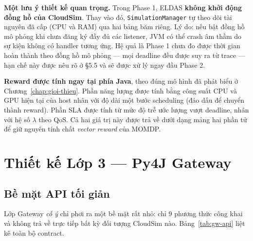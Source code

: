 \textbf{Một lưu ý thiết kế quan trọng.} Trong Phase 1, ELDAS
\textbf{không khởi động đồng hồ của CloudSim}. Thay vào đó,
\texttt{SimulationManager} tự theo dõi tài nguyên đã cấp (CPU và RAM)
qua hai bảng băm riêng. Lý do: nếu bật đồng hồ mô phỏng khi chưa đăng
ký đầy đủ các listener, JVM có thể crash âm thầm do sự kiện không có
handler tương ứng. Hệ quả là Phase 1 chưa đo được thời gian hoàn thành
theo đồng hồ mô phỏng --- mọi deadline đều được suy ra từ trace ---
hạn chế này được nêu rõ ở §5.5 và sẽ được xử lý ngay đầu Phase 2.

\textbf{Reward được tính ngay tại phía Java}, theo đúng mô hình đã
phát biểu ở Chương~\ref{chap:gioi-thieu}. Phần năng lượng được tính
bằng công suất CPU và GPU hiện tại của host nhân với độ dài một bước
scheduling (đảo dấu để chuyển thành reward). Phần SLA được tính từ
mức độ trễ ước lượng vượt deadline, nhân với hệ số $\lambda$ theo
QoS. Cả hai giá trị này được trả về dưới dạng mảng hai phần tử để giữ
nguyên tính chất \textit{vector reward} của MOMDP.

\section{Thiết kế Lớp 3 — Py4J Gateway}
\label{sec:layer-py4j}

\subsection{Bề mặt API tối giản}
Lớp Gateway \emph{cố ý} chỉ phơi ra một bề mặt rất nhỏ: chỉ $9$ phương
thức công khai và không trả về trực tiếp bất kỳ đối tượng CloudSim
nào. Bảng~\ref{tab:gw-api} liệt kê toàn bộ contract.


